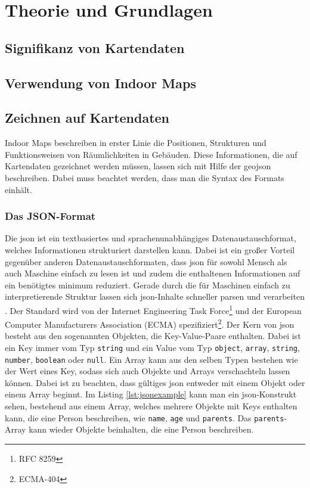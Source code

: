 \chapter{Theorie und Grundlagen}
\label{ch:theorybasics}
\section{Signifikanz von Kartendaten}

\section{Verwendung von Indoor Maps}

\section{Zeichnen auf Kartendaten}
Indoor Maps beschreiben in erster Linie die Positionen, Strukturen und Funktionsweisen von Räumlichkeiten in Gebäuden. Diese Informationen, die auf Kartendaten gezeichnet werden müssen, lassen sich mit Hilfe der \acs{geojson} beschreiben. Dabei muss beachtet werden, dass man die Syntax des Formats einhält.

\subsection{Das JSON-Format}
Die \ac{json} ist ein textbasiertes und sprachenunabhängiges Datenaustauschformat, welches Informationen strukturiert darstellen kann. Dabei ist ein großer Vorteil gegenüber anderen Datenaustauschformaten, dass \ac{json} für sowohl Mensch als auch Maschine einfach zu lesen ist und zudem die enthaltenen Informationen auf ein benötigtes minimum reduziert. Gerade durch die für Maschinen einfach zu interpretierende Struktur lassen sich \ac{json}-Inhalte schneller parsen und verarbeiten \parencite{WYS2014}. Der Standard wird von der Internet Engineering Task Force\footnote{RFC 8259} und der European Computer Manufacturers Association (ECMA) spezifiziert\footnote{ECMA-404}.\pbreak%
%
Der Kern von \ac{json} besteht aus den sogenannten Objekten, die Key-Value-Paare enthalten. Dabei ist ein Key immer vom Typ \texttt{string} und ein Value vom Typ \texttt{object}, \texttt{array}, \texttt{string}, \texttt{number}, \texttt{boolean} oder \texttt{null}. Ein Array kann aus den selben Typen bestehen wie der Wert eines Key, sodass sich auch Objekte und Arrays verschachteln lassen können. Dabei ist zu beachten, dass gültiges \ac{json} entweder mit einem Objekt oder einem Array beginnt. Im Listing \ref{lst:jsonexample} kann man ein \ac{json}-Konstrukt sehen, bestehend aus einem Array, welches mehrere Objekte mit Keys enthalten kann, die eine Person beschreiben, wie \texttt{name}, \texttt{age} und \texttt{parents}. %
Das \texttt{parents}-Array kann wieder Objekte beinhalten, die eine Person beschreiben.
%
%
